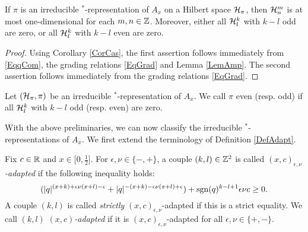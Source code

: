 \begin{Cor}\label{CorOneDim} If $\pi$ is an irreducible $^*$-representation of $A_x$ on a Hilbert space $\mathcal{H}_{\pi}$, then $\mathcal{H}^m_n$ is at most one-dimensional for each $m,n\in \mathbb{Z}$. Moreover, either all $\mathcal{H}^k_l$ with $k-l$ odd are zero, or all $\mathcal{H}^k_l$ with $k-l$ even are zero. 
\end{Cor} 
\begin{proof} 
Using Corollary \ref{CorCas}, the first assertion follows immediately from \eqref{EqqCom}, the grading relations \eqref{EqGrad} and Lemma \ref{LemAmp}. The second assertion follows immediately from the grading relations \eqref{EqGrad}.
\end{proof}

\begin{Def} Let $(\mathcal{H}_{\pi},\pi)$ be an irreducible $^*$-representation of $A_x$. We call $\pi$ even (resp. odd) if all $\mathcal{H}^k_l$ with $k-l$ odd (resp. even) are zero.
\end{Def} 


With the above preliminaries, we can now classify the irreducible $^*$-representations of $A_x$. We first extend the terminology of Definition \ref{DefAdapt}.


\begin{Def} Fix $c\in \mathbb{R}$ and $x\in \lbrack 0,\frac{1}{2}\rbrack$. For $\epsilon,\nu\in \{-,+\}$, a couple $(k,l)\in \mathbb{Z}^2$ is called \emph{$(x,c)_{\epsilon,\nu}$-adapted} if the following inequality holds: \begin{equation}\label{EqAd}(|q|^{(x+k)+\epsilon\nu(x+l)-\epsilon}+|q|^{-(x+k)-\epsilon\nu(x+l)+\epsilon})+\operatorname{\mathrm{sgn}}(q)^{k-l+1}\epsilon\nu c\geq 0.\end{equation} A couple $(k,l)$ is called \emph{strictly} $(x,c)_{\epsilon,\nu}$-adapted if this is a strict equality. We call $(k,l)$ \emph{$(x,c)$-adapted} if it is $(x,c)_{\epsilon,\nu}$-adapted for all $\epsilon,\nu\in \{+,-\}$. 
\end{Def} 

